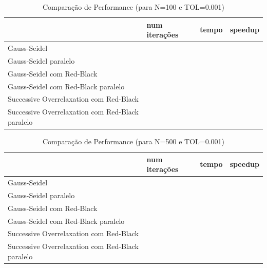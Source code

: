 \documentclass[a4paper]{report}
\begin{document}
\begin{table}[h]
\centering
\begin{tabular}{|l|l|l|l|}
\hline
                                                 & num iterações & tempo & speedup \\ \hline
Gauss-Seidel                                     &               &       &         \\ \hline
Gauss-Seidel paralelo                            &               &       &         \\ \hline
Gauss-Seidel com Red-Black                       &               &       &         \\ \hline
Gauss-Seidel com Red-Black paralelo              &               &       &         \\ \hline
Successive Overrelaxation com Red-Black          &               &       &         \\ \hline
Successive Overrelaxation com Red-Black paralelo &               &       &         \\ \hline
\end{tabular}
\caption{Comparação de Performance (para N=100 e TOL=0.001)}
\label{tab:tempo}
\end{table}

\begin{table}[h]
\centering
\begin{tabular}{|l|l|l|l|}
\hline
                                                 & num iterações & tempo & speedup \\ \hline
Gauss-Seidel                                     &               &       &         \\ \hline
Gauss-Seidel paralelo                            &               &       &         \\ \hline
Gauss-Seidel com Red-Black                       &               &       &         \\ \hline
Gauss-Seidel com Red-Black paralelo              &               &       &         \\ \hline
Successive Overrelaxation com Red-Black          &               &       &         \\ \hline
Successive Overrelaxation com Red-Black paralelo &               &       &         \\ \hline
\end{tabular}
\caption{Comparação de Performance (para N=500 e TOL=0.001)}
\label{tab:tempo}
\end{table}
\end{document}
